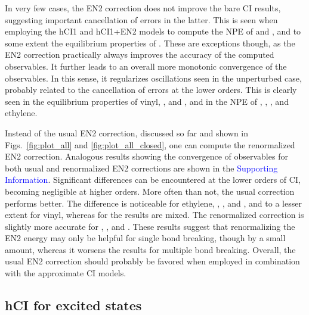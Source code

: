 \documentclass[aip,jcp,reprint,noshowkeys,superscriptaddress]{revtex4-1}
\newcommand{\SupInf}{\textcolor{blue}{Supporting Information}}
\begin{document}
In very few cases, the EN2 correction does not improve the bare CI results, suggesting important cancellation of errors in the latter.
This is seen when employing the hCI1 and hCI1+EN2 models to compute the NPE of  and , and to some extent the equilibrium properties of .
These are exceptions though, as the EN2 correction practically always improves the accuracy of the computed observables.
It further leads to an overall more monotonic convergence of the observables.
In this sense, it regularizes oscillations seen in the unperturbed case, probably related to the cancellation of errors at the lower orders.
This is clearly seen in the equilibrium properties of vinyl, , and ,
and in the NPE of , , , and ethylene.

Instead of the usual EN2 correction, discussed so far and shown in Figs.~\ref{fig:plot_all} and \ref{fig:plot_all_closed},
one can compute the renormalized EN2 correction. \cite{Garniron_2019}
Analogous results showing the convergence of observables for both usual and renormalized EN2 corrections are shown in the {\SupInf}.
Significant differences can be encountered at the lower orders of CI, becoming negligible at higher orders.
More often than not, the usual correction performs better.
The difference is noticeable for ethylene, , , and , and to a lesser extent for vinyl,
whereas for  the results are mixed.
The renormalized correction is slightly more accurate for , , and .
These results suggest that renormalizing the EN2 energy may only be helpful for single bond breaking, though by a small amount,
whereas it worsens the results for multiple bond breaking.
Overall, the usual EN2 correction should probably be favored when employed in combination with the approximate CI models.

\subsection{hCI for excited states}
\label{sec:res_C}
\end{document}
